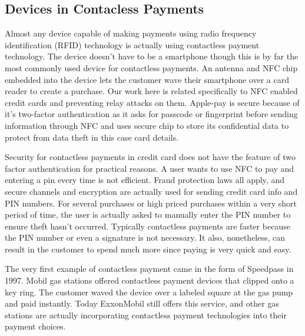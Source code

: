 \documentclass[conference]{IEEEtran}
\begin{document}
\subsection{Devices in Contacless Payments}
Almost any device capable of making payments using radio frequency identification (RFID) technology is actually using contactless payment technology. The device doesn't have to be a smartphone though this is by far the most commonly used device for contactless payments. An antenna and NFC chip embedded into the device lets the customer wave their smartphone over a card reader to create a purchase. Our work here is related specifically to NFC enabled credit cards and preventing relay attacks on them. Apple-pay is secure because of it's two-factor authentication as it asks for passcode or fingerprint before sending information through NFC and uses secure chip to store its confidential data to protect from data theft in this case card details.

Security for contactless payments in credit card does not have the feature of two factor authentication for practical reasons. A user wants to use NFC to pay and entering a pin every time is not efficient. Fraud protection laws all apply, and secure channels and encryption are actually used for sending credit card info and PIN numbers. For several purchases or high priced purchases within a very short period of time, the user is actually asked to manually enter the PIN number to ensure theft hasn't occurred. Typically contactless payments are faster because the PIN number or even a signature is not necessary. It also, nonetheless, can result in the customer to spend much more since paying is very quick and easy.

The very first example of contactless payment came in the form of Speedpass in 1997. Mobil gas stations offered contactless payment devices that clipped onto a key ring. The customer waved the device over a labeled square at the gas pump and paid instantly. Today ExxonMobil still offers this service, and other gas stations are actually incorporating contactless payment technologies into their payment choices.
\end{document}
